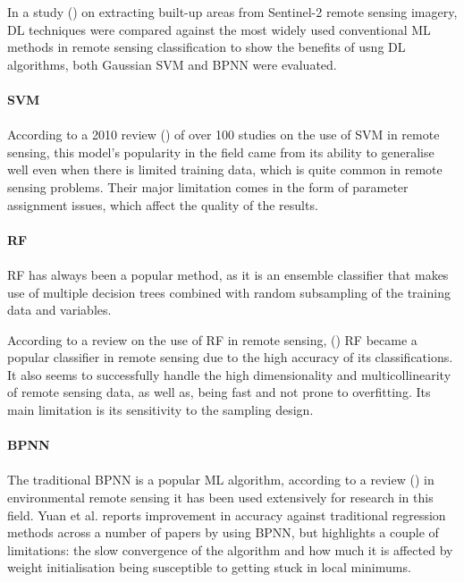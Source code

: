 In a study (\cite{isprs-archives-XLII-3-79-2018}) on extracting built-up areas from Sentinel-2 remote sensing imagery, \gls{DL} techniques were compared against the most widely used conventional \gls{ML} methods in remote sensing classification to show the benefits of usng \gls{DL} algorithms, both Gaussian \gls{SVM} and \gls{BPNN} were evaluated.

\paragraph{\gls{SVM}}
\paragraph{}
According to a 2010 review (\cite{MOUNTRAKIS2011247}) of over 100 studies on the use of \gls{SVM} in remote sensing, this model's popularity in the field came from its ability to generalise well even when there is limited training data, which is quite common in remote sensing problems. Their major limitation comes in the form of parameter assignment issues, which affect the quality of the results.

\paragraph{\gls{RF}}
\paragraph{}
\gls{RF} has always been a popular method, as it is an ensemble classifier that makes use of multiple decision trees combined with random subsampling of the training data and variables. 

According to a review on the use of \gls{RF} in remote sensing, (\cite{BELGIU201624}) \gls{RF} became a popular classifier in remote sensing due to the high accuracy of its classifications. It also seems to successfully handle the high dimensionality and multicollinearity of remote sensing data, as well as, being fast and not prone to overfitting. Its main limitation is its sensitivity to the sampling design.

\paragraph{\gls{BPNN}}
\paragraph{}
The traditional \gls{BPNN} is a popular \gls{ML} algorithm, according to a review (\cite{YUAN2020111716}) in environmental remote sensing it has been used extensively for research in this field. Yuan et al. reports improvement in accuracy against traditional regression methods across a number of papers by using \gls{BPNN}, but highlights a couple of limitations: the slow convergence of the algorithm and how much it is affected by weight initialisation being susceptible to getting stuck in local minimums. 

